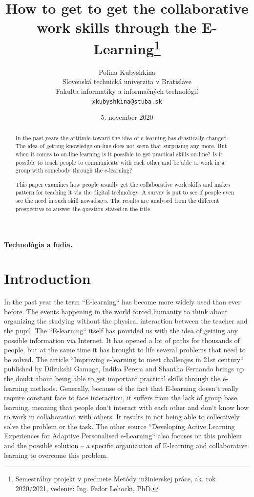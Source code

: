 \documentclass[10pt,oneside,english,a4paper]{article}
\title{How to get  to get the collaborative work skills through the E-Learning\thanks{Semestrálny projekt v predmete Metódy inžinierskej práce, ak. rok 2020/2021, vedenie: Ing. Fedor Lehocki, PhD.}}
\author{Polina Kubyshkina\\[2pt]
	{\small Slovenská technická univerzita v Bratislave}\\
	{\small Fakulta informatiky a informačných technológií}\\
	{\small \texttt{xkubyshkina@stuba.sk}}
	}
\date{\small  5. november 2020}
\begin{document}
\maketitle
\paragraph{Technológia a ľudia.}
\begin{abstract}
In the past years the attitude toward the idea of e-learning has drastically changed. The idea of getting knowledge on-line does not seem that surprising any more. But when it comes to on-line learning is it possible to get practical skills on-line? Is it possible to teach people to communicate with each other and be able to work in a group with somebody through the e-learning?\par
This paper examines how people usually get the collaborative work skills and makes pattern for teaching it via the digital technology. A survey is put to see if people even see the need in such skill nowadsays. The results are analysed from the different prospective to answer the question stated in the title.
\end{abstract}

\section{Introduction}

In the past year the term ``E-learning`` has become more widely used than ever before. The events happening in the world forced humanity to think about organizing the studying without the physical interaction between the teacher and the pupil. The ``E-learning`` itself has provided us with the idea of getting any possible information via Internet. It has opened a lot of paths for thousands of people, but at the same time it has brought to life several problems that need to be solved. The article ``Improving e-learning to meet challenges in 21st century`` published by Dilrukshi Gamage, Indika Perera and Shantha Fernando brings up the doubt about being able to get important practical skills through the e-learning methods.\cite{collab2} Generally, because of the fact that E-learning doesn`t really require constant face to face interaction, it suffers from the lack of group base learning, meaning that people don`t interact with each other and don`t know how to work in collaboration with others. It results in not being able to collectively solve the problem or the task. The other source ``Developing Active Learning Experiences for Adaptive Personalised e-Learning`` also focuses on this problem and the possible solution – a specific organization of E-learning and collaborative learning to overcome this problem.\cite{collab1}
\end{document}
